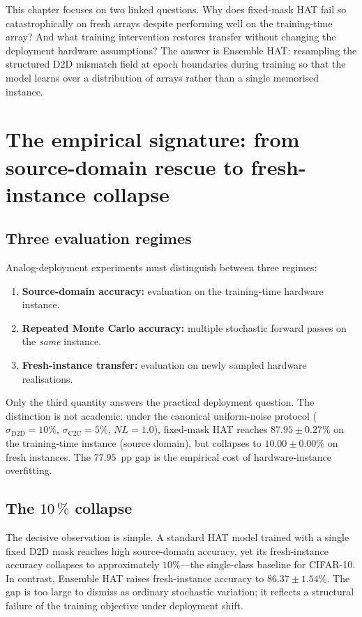 This chapter focuses on two linked questions.  Why does fixed-mask HAT fail so catastrophically on fresh arrays despite performing well on the training-time array?  And what training intervention restores transfer without changing the deployment hardware assumptions?  The answer is Ensemble HAT: resampling the structured D2D mismatch field at epoch boundaries during training so that the model learns over a distribution of arrays rather than a single memorised instance.


\section{The empirical signature: from source-domain rescue to fresh-instance collapse}
\label{sec:ch1-empirical-signature}

\subsection{Three evaluation regimes}

Analog-deployment experiments must distinguish between three regimes:
\begin{enumerate}
    \item \textbf{Source-domain accuracy:} evaluation on the training-time hardware instance.
    \item \textbf{Repeated Monte Carlo accuracy:} multiple stochastic forward passes on the \emph{same} instance.
    \item \textbf{Fresh-instance transfer:} evaluation on newly sampled hardware realisations.
\end{enumerate}
Only the third quantity answers the practical deployment question.  The distinction is not academic: under the canonical uniform-noise protocol ($\sigma_{\mathrm{D2D}}=10\%$, $\sigma_{\mathrm{C2C}}=5\%$, $NL=1.0$), fixed-mask HAT reaches $87.95\pm0.27\%$ on the training-time instance (source domain), but collapses to $10.00\pm0.00\%$ on fresh instances.  The $77.95$~pp gap is the empirical cost of hardware-instance overfitting.

\subsection{The $10\,\%$ collapse}

The decisive observation is simple.  A standard HAT model trained with a single fixed D2D mask reaches high source-domain accuracy, yet its fresh-instance accuracy collapses to approximately $10\%$---the single-class baseline for CIFAR-10.  In contrast, Ensemble HAT raises fresh-instance accuracy to $86.37\pm1.54\%$.  The gap is too large to dismiss as ordinary stochastic variation; it reflects a structural failure of the training objective under deployment shift.


